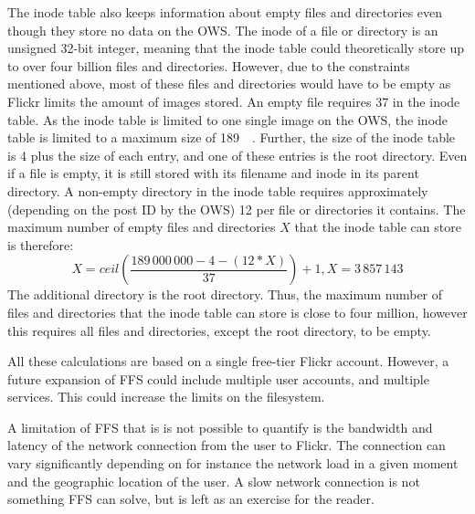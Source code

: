 The inode table also keeps information about empty files and directories even though they store no data on the OWS. The inode of a file or directory is an unsigned 32-bit integer, meaning that the inode table could theoretically store up to over four billion files and directories. However, due to the constraints mentioned above, most of these files and directories would have to be empty as Flickr limits the amount of images stored. An empty file requires \SI{37}{\byte} in the inode table. As the inode table is limited to one single image on the OWS, the inode table is limited to a maximum size of \SI{189}{\mega\byte}. Further, the size of the inode table is \SI{4}{\byte} plus the size of each entry, and one of these entries is the root directory. Even if a file is empty, it is still stored with its filename and inode in its parent directory. A non-empty directory in the inode table requires approximately (depending on the post ID by the OWS) \SI{12}{\byte} per file or directories it contains. The maximum number of empty files and directories $X$ that the inode table can store is therefore:
$$
	X = ceil(\frac{189\,000\,000 - 4 - (12 * X)}{37}) + 1, X = 3\,857\,143
$$
The additional directory is the root directory. Thus, the maximum number of files and directories that the inode table can store is close to four million, however this requires all files and directories, except the root directory, to be empty.



All these calculations are based on a single free-tier Flickr account. However, a future expansion of FFS could include multiple user accounts, and multiple services. This could increase the limits on the filesystem.

A limitation of FFS that is is not possible to quantify is the bandwidth and latency of the network connection from the user to Flickr. The connection can vary significantly depending on for instance the network load in a given moment and the geographic location of the user. A slow network connection is not something FFS can solve, but is left as an exercise for the reader.